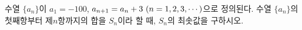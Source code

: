 \hspace*{2mm}\begin{minipage}[t]{\dimexpr\linewidth-2mm\relax}\vspace{0pt}
수열 $\{a_n\}$이 $a_1=-100$, $a_{n+1}=a_n+3\ (n=1{,}\mkern3mu\mathopen{}2{,}\mkern3mu\mathopen{}3{,}\mkern3mu\mathopen{}\cdots)$으로 정의된다. 수열 $\{a_n\}$의 첫째항부터 제$n$항까지의 합을 $S_n$이라 할 때, $S_n$의 최솟값을 구하시오.\end{minipage}
